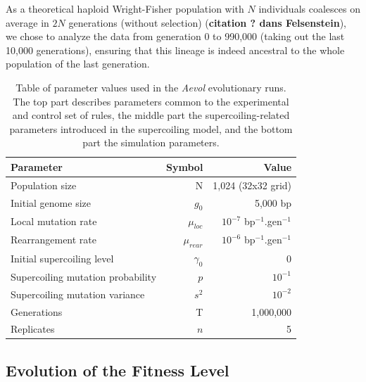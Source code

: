 As a theoretical haploid Wright-Fisher population with $N$ individuals coalesces on average in $2N$ generations (without selection) (\textbf{citation ? dans Felsenstein}), we chose to analyze the data from generation 0 to 990,000 (taking out the last 10,000 generations), ensuring that this lineage is indeed ancestral to the whole population of the last generation.

\begin{table}[h]
  \begin{center}
    \begin{tabular}{ l r r }
    \toprule
    \textbf{Parameter} & \textbf{Symbol} & \textbf{Value}\\
    \midrule
    Population size & N & 1,024 (32x32 grid) \\
    Initial genome size & $g_0$ & 5,000 bp \\
    Local mutation rate & $\mu_{loc}$ & $10^{-7}$ bp$^{-1}$.gen$^{-1}$ \\
    Rearrangement rate & $\mu_{rear}$ &$10^{-6}$ bp$^{-1}$.gen$^{-1}$ \\
    \midrule
    Initial supercoiling level & $\gamma_0$ & 0 \\
    Supercoiling mutation probability & $p$ & $10^{-1}$ \\
    Supercoiling mutation variance & $s^2$ & $10^{-2}$ \\
    \midrule
    Generations & T & 1,000,000 \\
    Replicates & $n$ & 5\\
    \bottomrule
    \end{tabular}
    \end{center}
  \caption[Table of parameter values for the \emph{Aevol} runs]{Table of parameter values used in the \emph{Aevol} evolutionary runs.
  The top part describes parameters common to the experimental and control set of rules, the middle part the supercoiling-related parameters introduced in the supercoiling model, and the bottom part the simulation parameters.}
  \label{tab:aevol:param_values}
\end{table}

\subsection{Evolution of the Fitness Level}

